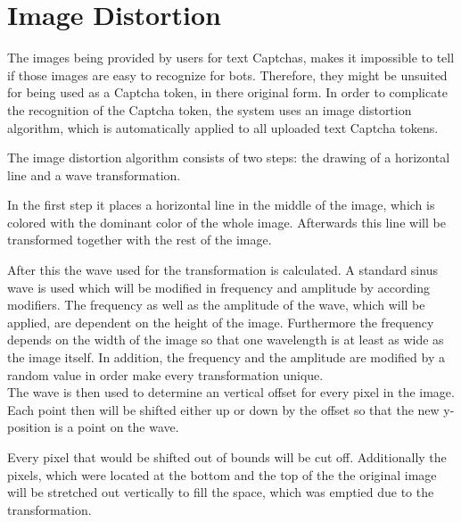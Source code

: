 \section{Image Distortion}
\label{sec:image_distortion}

The images being provided by users for text Captchas, makes it impossible to tell if those images are easy to recognize for bots. Therefore, they might be unsuited for being used as a Captcha token, in there original form. In order to complicate the recognition of the Captcha token, the system uses an image distortion algorithm, which is automatically applied to all uploaded text Captcha tokens.

The image distortion algorithm consists of two steps: the drawing of a horizontal line and a wave transformation.

In the first step it places a horizontal line in the middle of the image, which is colored with the dominant color of the whole image. Afterwards this line will be transformed together with the rest of the image.

After this the wave used for the transformation is calculated. A standard sinus wave is used which will be modified in frequency and amplitude by according modifiers. The frequency as well as the amplitude of the wave, which will be applied, are dependent on the height of the image. Furthermore the frequency depends on the width of the image so that one wavelength is at least as wide as the image itself. In addition, the frequency and the amplitude are modified by a random value in order make every transformation unique.\\
The wave is then used to determine an vertical offset for every pixel in the image. Each point then will be shifted either up or down by the offset so that the new y-position is a point on the wave. 

Every pixel that would be shifted out of bounds will be cut off. Additionally the pixels, which were located at the bottom and the top of the the original image will be stretched out vertically to fill the space, which was emptied due to the transformation.

\clearpage
